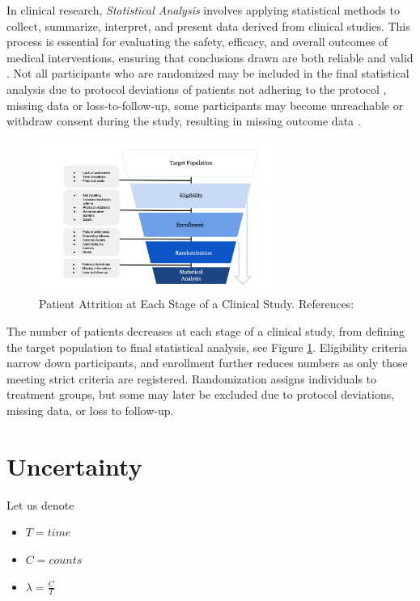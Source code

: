 In clinical research, \textit{Statistical Analysis} involves applying statistical methods to collect, summarize, interpret, and present data derived from clinical studies. This process is essential for evaluating the safety, efficacy, and overall outcomes of medical interventions, ensuring that conclusions drawn are both reliable and valid \citep{panos2023statistical}. Not all participants who are randomized may be included in the final statistical analysis due to protocol deviations of patients not adhering to the protocol \citep{rehman2020exclusion}, missing data \citep{shih2002problems} or loss-to-follow-up, some participants may become unreachable or withdraw consent during the study, resulting in missing outcome data \citep{nuesch2009effects}.

\begin{figure}[h]
  \centering
  \includegraphics[width=0.7\textwidth]{fig_2_1.png}
  \caption{Patient Attrition at Each Stage of a Clinical Study. References: \cite{piantadosi2022principles, whelan2018high, bogin2022lasagna}}
  \label{fig:2_1}
\end{figure}

The number of patients decreases at each stage of a clinical study, from defining the target population to final statistical analysis, see Figure \ref{fig:2_1}. Eligibility criteria narrow down participants, and enrollment further reduces numbers as only those meeting strict criteria are registered. Randomization assigns individuals to treatment groups, but some may later be excluded due to protocol deviations, missing data, or loss to follow-up. 


\section{Uncertainty}

Let us denote

\begin{itemize}
\item $T=time$
\item $C=counts$
\item $\lambda=\frac{C}{T}$
\end{itemize}

